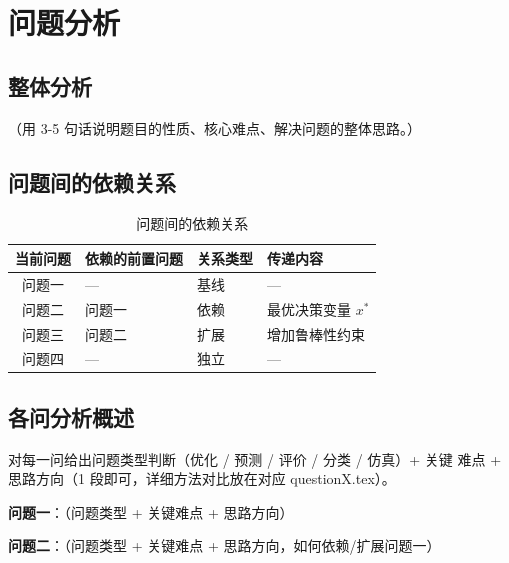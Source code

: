 %

\section{问题分析}

\subsection{整体分析}

（用 3-5 句话说明题目的性质、核心难点、解决问题的整体思路。）

\subsection{问题间的依赖关系}


\begin{table}[htbp]
  \centering
  \caption{问题间的依赖关系}
  \label{tab:dependency}
  \begin{tabular}{clll}
    \toprule
    \textbf{当前问题} & \textbf{依赖的前置问题} & \textbf{关系类型} & \textbf{传递内容} \\
    \midrule
    问题一 & —       & 基线       & —                         \\
    问题二 & 问题一  & 依赖       & 最优决策变量 $x^*$         \\
    问题三 & 问题二  & 扩展       & 增加鲁棒性约束             \\
    问题四 & —       & 独立       & —                         \\
    \bottomrule
  \end{tabular}
\end{table}

\subsection{各问分析概述}

对每一问给出问题类型判断（优化 / 预测 / 评价 / 分类 / 仿真）+ 关键
难点 + 思路方向（1 段即可，详细方法对比放在对应 questionX.tex）。

\textbf{问题一}：（问题类型 + 关键难点 + 思路方向）

\textbf{问题二}：（问题类型 + 关键难点 + 思路方向，如何依赖/扩展问题一）

